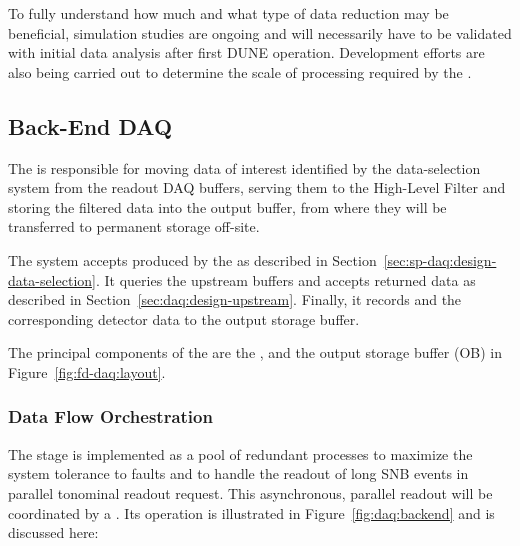 To fully understand how much and what type of data reduction may be
beneficial, simulation studies are ongoing \cite{bib:docdb11311} and will
necessarily have to be
validated with initial data analysis after
first DUNE  operation. Development efforts are also being
carried out to determine the scale of 
processing required by the .


\subsection{Back-End DAQ}
\label{sec:fd-daq:design-backend}

The   is responsible for moving data of interest identified by the data-selection system from the readout DAQ buffers, serving them to the High-Level Filter and storing the filtered data into the output buffer, from where they will be transferred to permanent storage off-site.

The  system accepts  produced by the  as described
in Section~\ref{sec:sp-daq:design-data-selection}.  It queries the upstream  buffers and
accepts returned data as described in Section~\ref{sec:daq:design-upstream}. Finally, it records
 and the corresponding detector data to the output storage buffer.

The principal components of the  are the ,  and the output
storage buffer (OB) in Figure~\ref{fig:fd-daq:layout}.


\subsubsection{Data Flow Orchestration}

The  stage is implemented as a pool of redundant  processes to maximize the system tolerance to faults and to handle the readout of long SNB events in parallel tonominal readout request. This asynchronous, parallel readout will be coordinated by a .  Its operation is illustrated in Figure~\ref{fig:daq:backend} and is discussed here:

